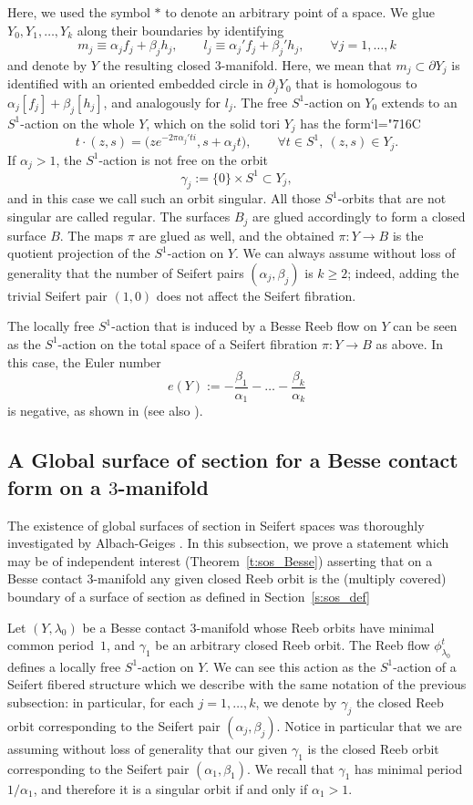 \documentclass[10pt,a4paper]{amsart}
\newcommand{\Subsection}{\subsection}
\numberwithin{equation}{section}
\newcommand{\Changelback}{\mathcode`l="716C}
\theoremstyle{definition}
\let\eul e
\begin{document}
Here, we used the symbol $*$ to denote an arbitrary point of a space. We glue $Y_0,Y_1,\dots,Y_k$ along their boundaries by identifying
\[
m_j\equiv\alpha_jf_j+\beta_j h_j,\qquad l_j\equiv\alpha_j'f_j+\beta_j'h_j,\qquad \forall j=1,\dots,k
\]
and denote by $Y$ the resulting closed $3$-manifold. Here, we mean that $m_j\subset\partial Y_j$ is identified with an oriented embedded circle in $\partial_j Y_0$ that is homologous to $\alpha_j[f_j]+\beta_j[h_j]$, and analogously for $l_j$.
The free $S^1$-action on $Y_0$ extends to an $S^1$-action on the whole $Y$, which on the solid tori $Y_j$ has the form\Changelback
\[
t\cdot(z,s)=\big(z e^{-2\pi\alpha_j't i},s+\alpha_j t\big),
\qquad
\forall t\in S^1,\ (z,s)\in Y_j.
\]
If $\alpha_j>1$, the $S^1$-action is not free on the orbit
\[
\gamma_j:=\{0\}\times S^1\subset Y_j,
\]
and in this case we call such an orbit singular. All those $S^1$-orbits that are not singular are called regular.
The surfaces $B_j$ are glued accordingly to form a closed surface $B$. The maps $\pi$ are glued as well, and the obtained $\pi:Y\to B$ is the quotient projection of the $S^1$-action on $Y$.
We can always assume without loss of generality that the number of Seifert pairs $(\alpha_j,\beta_j)$ is $k\geq2$; indeed, adding the trivial Seifert pair $(1,0)$ does not affect the Seifert fibration.

The locally free $S^1$-action that is induced by a Besse Reeb flow on $Y$ can be seen as the $S^1$-action on the total space of a Seifert fibration $\pi:Y\to B$ as above. In this case, the Euler number
\[
\eul(Y):=-\frac{\beta_1}{\alpha_1}-\dots-\frac{\beta_k}{\alpha_k}
\]
is negative, as shown in \cite{Lisca:2004oz} (see also \cite[Th.\,1.4]{Kegel:2021vo}).

\Subsection{A Global surface of section for a Besse contact form on a $3$-manifold}
\label{s:sos_Besse}
The existence of global surfaces of section in Seifert spaces was thoroughly investigated by Albach-Geiges \cite{Albach:2021wi}. In this subsection, we prove a statement which may be of independent interest (Theorem~\ref{t:sos_Besse}) asserting that on a Besse contact $3$-manifold any given closed Reeb orbit is the (multiply covered) boundary of a surface of section as defined in Section~\ref{s:sos_def}

Let $(Y,\lambda_0)$ be a Besse contact $3$-manifold whose Reeb orbits have minimal common period~$1$, and $\gamma_1$ be an arbitrary closed Reeb orbit. The Reeb flow $\phi_{\lambda_0}^t$ defines a locally free $S^1$-action on $Y$. We can see this action as the $S^1$-action of a Seifert fibered structure which we describe with the same notation of the previous subsection: in particular, for each $j=1,\dots,k$, we denote by $\gamma_j$ the closed Reeb orbit corresponding to the Seifert pair $(\alpha_j,\beta_j)$. Notice in particular that we are assuming without loss of generality that our given $\gamma_1$ is the closed Reeb orbit corresponding to the Seifert pair $(\alpha_1,\beta_1)$. We recall that $\gamma_1$ has minimal period $1/\alpha_1$, and therefore it is a singular orbit if and only if $\alpha_1>1$.
\end{document}
